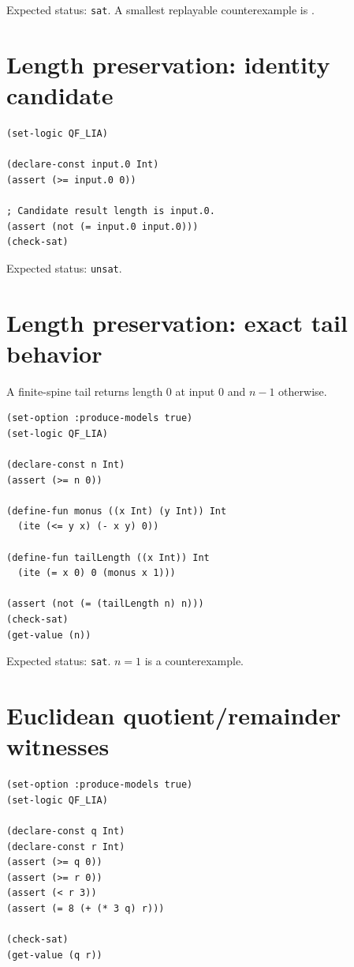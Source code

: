 \documentclass[10pt,letterpaper,oneside]{report}
\newcommand{\code}[1]{\texttt{\detokenize{#1}}}
\newcommand{\sat}{\texttt{sat}}
\newcommand{\unsat}{\texttt{unsat}}
\begin{document}
Expected status: \sat. A smallest replayable counterexample is \code{input.0 = 1}.

\section{Length preservation: identity candidate}

\begin{lstlisting}[language=SMTLib]
(set-logic QF_LIA)

(declare-const input.0 Int)
(assert (>= input.0 0))

; Candidate result length is input.0.
(assert (not (= input.0 input.0)))
(check-sat)
\end{lstlisting}

Expected status: \unsat.

\section{Length preservation: exact tail behavior}

A finite-spine tail returns length $0$ at input $0$ and $n-1$ otherwise.

\begin{lstlisting}[language=SMTLib]
(set-option :produce-models true)
(set-logic QF_LIA)

(declare-const n Int)
(assert (>= n 0))

(define-fun monus ((x Int) (y Int)) Int
  (ite (<= y x) (- x y) 0))

(define-fun tailLength ((x Int)) Int
  (ite (= x 0) 0 (monus x 1)))

(assert (not (= (tailLength n) n)))
(check-sat)
(get-value (n))
\end{lstlisting}

Expected status: \sat. $n=1$ is a counterexample.

\section{Euclidean quotient/remainder witnesses}

\begin{lstlisting}[language=SMTLib]
(set-option :produce-models true)
(set-logic QF_LIA)

(declare-const q Int)
(declare-const r Int)
(assert (>= q 0))
(assert (>= r 0))
(assert (< r 3))
(assert (= 8 (+ (* 3 q) r)))

(check-sat)
(get-value (q r))
\end{lstlisting}
\end{document}
